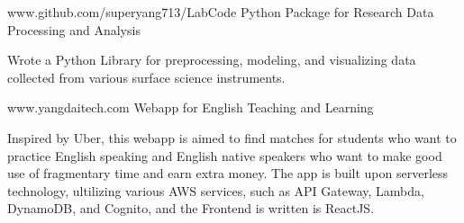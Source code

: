 


\begin{cventries}


\cventry
{www.github.com/superyang713/LabCode}
{Python Package for Research Data Processing and Analysis}
{}
{}
{
\begin{cvitems}
\item {Wrote a Python Library for preprocessing, modeling, and visualizing data
    collected from various surface science instruments.}
\end{cvitems}
}


\cventry
{www.yangdaitech.com}
{Webapp for English Teaching and Learning}
{}
{}
{
\begin{cvitems}
\item {Inspired by Uber, this webapp is aimed to find matches for students who
    want to practice English speaking and English native speakers who want to
    make good use of fragmentary time and earn extra money. The app is built
    upon serverless technology, ultilizing various AWS services, such as API
    Gateway, Lambda, DynamoDB, and Cognito, and the Frontend is written is
    ReactJS.}
\end{cvitems}
}


\end{cventries}


